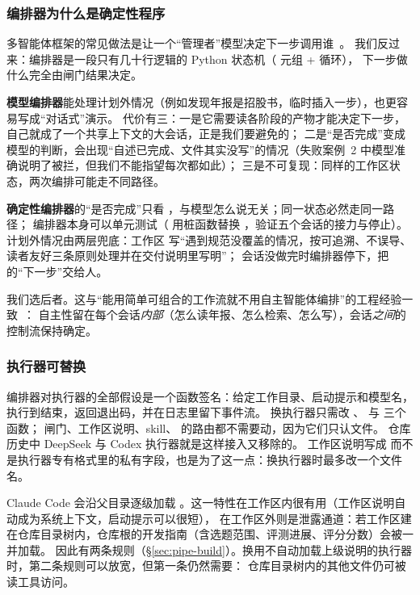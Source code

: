 \subsubsection{编排器为什么是确定性程序}

多智能体框架的常见做法是让一个“管理者”模型决定下一步调用谁~\citep{wu2023autogen,hong2024metagpt,qian2024chatdev,li2023camel}。
我们反过来：编排器是一段只有几十行逻辑的 Python 状态机（ 元组 +  循环），
下一步做什么完全由闸门结果决定。

\begin{tradeoff}
\textbf{模型编排器}能处理计划外情况（例如发现年报是招股书，临时插入一步），也更容易写成“对话式”演示。
代价有三：一是它需要读各阶段的产物才能决定下一步，自己就成了一个共享上下文的大会话，正是我们要避免的；
二是“是否完成”变成模型的判断，会出现“自述已完成、文件其实没写”的情况（失败案例~2 中模型准确说明了被拦，但我们不能指望每次都如此）；
三是不可复现：同样的工作区状态，两次编排可能走不同路径。

\textbf{确定性编排器}的“是否完成”只看 ，与模型怎么说无关；同一状态必然走同一路径；
编排器本身可以单元测试（ 用桩函数替换 ，验证五个会话的接力与停止）。
计划外情况由两层兜底：工作区  写“遇到规范没覆盖的情况，按可追溯、不误导、读者友好三条原则处理并在交付说明里写明”；
会话没做完时编排器停下，把  的“下一步”交给人。

我们选后者。这与“能用简单可组合的工作流就不用自主智能体编排”的工程经验一致~\citep{schluntz2024effective}：
自主性留在每个会话\emph{内部}（怎么读年报、怎么检索、怎么写），会话\emph{之间}的控制流保持确定。
\end{tradeoff}

\subsubsection{执行器可替换}

编排器对执行器的全部假设是一个函数签名：给定工作目录、启动提示和模型名，执行到结束，返回退出码，并在日志里留下事件流。
换执行器只需改 、 与  三个函数；
闸门、工作区说明、skill、 的路由都不需要动，因为它们只认文件。
仓库历史中 DeepSeek 与 Codex 执行器就是这样接入又移除的。
工作区说明写成  而不是执行器专有格式里的私有字段，也是为了这一点：换执行器时最多改一个文件名。

\begin{tradeoff}[：执行器的上下文自动加载]
Claude Code 会沿父目录逐级加载 。这一特性在工作区内很有用（工作区说明自动成为系统上下文，启动提示可以很短），
在工作区外则是泄露通道：若工作区建在仓库目录树内，仓库根的开发指南（含选题范围、评测进展、评分分数）会被一并加载。
 因此有两条规则（\S\ref{sec:pipe-build}）。换用不自动加载上级说明的执行器时，第二条规则可以放宽，但第一条仍然需要：
仓库目录树内的其他文件仍可被读工具访问。
\end{tradeoff}

